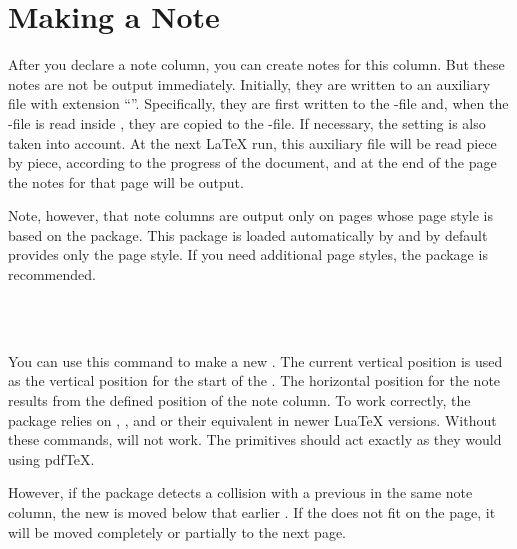\EndIndexGroup


\section{Making a Note}

After you declare a note column, you can create notes for this column. But
these notes are not be output immediately. Initially, they are written to an
auxiliary file with extension ``''. Specifically, they are first
written to the -file and, when the -file is read inside
, they are copied to the -file. If
necessary, the  setting is also taken into
account. At the next \LaTeX{} run, this auxiliary file will be read piece by
piece, according to the progress of the document, and at the end of the page
the notes for that page will be output.

Note, however, that note columns are output only on pages
whose page style is based on the 
package. This package is loaded automatically by 
and by default provides only the  page
style. If you need additional page styles, the
 package is
recommended.

\begin{Declaration}
  \\
  \\
\end{Declaration}
You can use this command to make a new . The current vertical
position is used as the vertical position for the start of the .
The horizontal position for the note results from the defined position of the
note column. To work correctly, the package relies on
,
, and
 or their equivalent in newer
Lua\TeX{} versions. Without these commands,  will
not work. The primitives should act exactly as they would using pdf\TeX.

However, if the package detects a collision with
a previous  in the same note column, the new  is moved
below that earlier . If the  does not fit on the
page, it will be moved completely or
partially to the next page.

